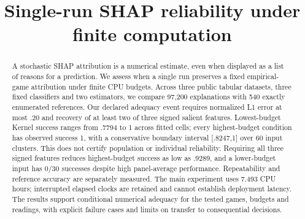\documentclass{article}
\title{Single-run SHAP reliability under finite computation}
\author{}
\begin{document}
\maketitle
\begin{abstract}
A stochastic SHAP attribution is a numerical estimate, even when displayed as a list of reasons for a prediction. We assess when a single run preserves a fixed empirical-game attribution under finite CPU budgets. Across three public tabular datasets, three fixed classifiers and two estimators, we compare 97,200 explanations with 540 exactly enumerated references. Our declared adequacy event requires normalized L1 error at most .20 and recovery of at least two of three signed salient features. Lowest-budget Kernel success ranges from .7794 to 1 across fitted cells; every highest-budget condition has observed success 1, with a conservative boundary interval [.8247,1] over 60 input clusters. This does not certify population or individual reliability. Requiring all three signed features reduces highest-budget success as low as .9289, and a lower-budget input has 0/30 successes despite high panel-average performance. Repeatability and reference accuracy are separately measured. The main experiment uses 7.493 CPU hours; interrupted elapsed clocks are retained and cannot establish deployment latency. The results support conditional numerical adequacy for the tested games, budgets and readings, with explicit failure cases and limits on transfer to consequential decisions.
\end{abstract}








\clearpage


\clearpage
\appendix


\clearpage

\clearpage

\clearpage

\clearpage

\clearpage

\end{document}
